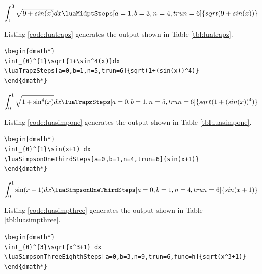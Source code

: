 \documentclass{article}
\begin{document}
\begin{table}[H]
\centering
\begin{dmath*}  
\int_{1}^{3}\sqrt{9+sin(x)} dx 
\luaMidptSteps[a=1,b=3,n=4,trun=6]{sqrt(9+sin(x))}
\end{dmath*} 
\caption{The luaMidptSteps command}
\label{tbl:luamidpt}
\end{table}

Listing \ref{code:luatrapz} generates the output shown in Table \ref{tbl:luatrapz}.

\begin{lstlisting}[label={code:luatrapz}, caption={The luaTrapzSteps command}]
\begin{dmath*}  
\int_{0}^{1}\sqrt{1+\sin^4(x)}dx 
\luaTrapzSteps[a=0,b=1,n=5,trun=6]{sqrt(1+(sin(x))^4)}
\end{dmath*}
\end{lstlisting}

\begin{table}[H]
\centering
\begin{dmath*}  
\int_{0}^{1}\sqrt{1+\sin^4(x)}dx 
\luaTrapzSteps[a=0,b=1,n=5,trun=6]{sqrt(1+(sin(x))^4)}
\end{dmath*} 
\caption{The luaTrapzSteps command}
\label{tbl:luatrapz}
\end{table}

Listing \ref{code:luasimpone} generates the output shown in Table \ref{tbl:luasimpone}.

\begin{lstlisting}[label={code:luasimpone}, caption={The luaSimpsonOnethirdSteps command}]
\begin{dmath*} 
\int_{0}^{1}\sin(x+1) dx
\luaSimpsonOneThirdSteps[a=0,b=1,n=4,trun=6]{sin(x+1)}
\end{dmath*}
\end{lstlisting}

\begin{table}[H]
\centering
\begin{dmath*} 
\int_{0}^{1}\sin(x+1) dx
\luaSimpsonOneThirdSteps[a=0,b=1,n=4,trun=6]{sin(x+1)}
\end{dmath*} 
\caption{The luaSimpsonOnethirdSteps command}
\label{tbl:luasimpone}
\end{table}

Listing \ref{code:luasimpthree} generates the output shown in Table \ref{tbl:luasimpthree}.

\begin{lstlisting}[label={code:luasimpthree}, caption={The luaSimpsonThreeEightSteps command}]
\begin{dmath*} 
\int_{0}^{3}\sqrt{x^3+1} dx
\luaSimpsonThreeEighthSteps[a=0,b=3,n=9,trun=6,func=h]{sqrt(x^3+1)}
\end{dmath*}
\end{lstlisting}
\end{document}
